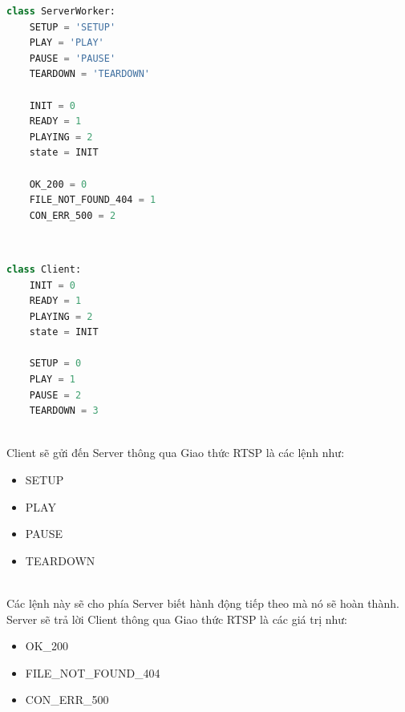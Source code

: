\documentclass[a4paper]{article}
\begin{document}
\begin{lstlisting}[language=Python]
class ServerWorker:
    SETUP = 'SETUP'
    PLAY = 'PLAY'
    PAUSE = 'PAUSE'
    TEARDOWN = 'TEARDOWN'
    
    INIT = 0
    READY = 1
    PLAYING = 2
    state = INIT
	
	OK_200 = 0
    FILE_NOT_FOUND_404 = 1
    CON_ERR_500 = 2
\end{lstlisting}
\\
\begin{lstlisting}[language=Python]
class Client:
    INIT = 0
    READY = 1
    PLAYING = 2
    state = INIT
    
    SETUP = 0
    PLAY = 1
    PAUSE = 2
    TEARDOWN = 3
\end{lstlisting}
\\
\tab Client sẽ gửi đến Server thông qua Giao thức RTSP là các lệnh như:
\begin{itemize}
    \item SETUP
    \item PLAY
    \item PAUSE
    \item TEARDOWN
\end{itemize}
\\
\tab Các lệnh này sẽ cho phía Server biết hành động tiếp theo mà nó sẽ hoàn thành.
\tab Server sẽ trả lời Client thông qua Giao thức RTSP là các giá trị như:
\begin{itemize}
    \item OK\_200
    \item FILE\_NOT\_FOUND\_404
    \item CON\_ERR\_500
\end{itemize}
\\
\end{document}

